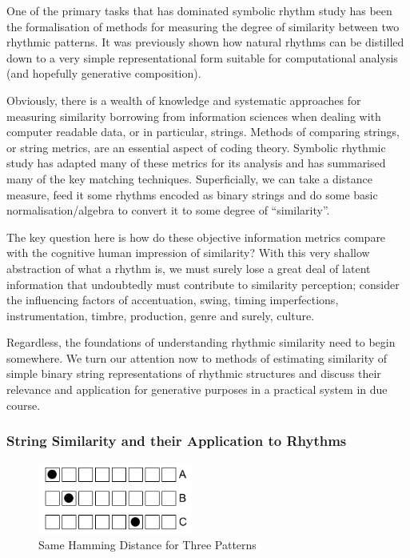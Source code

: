 One of the primary tasks that has dominated symbolic rhythm study has been the formalisation of methods for measuring the degree of similarity between two rhythmic patterns. It was previously shown how natural rhythms can be distilled down to a very simple representational form suitable for computational analysis (and hopefully generative composition).

Obviously, there is a wealth of knowledge and systematic approaches for measuring similarity borrowing from information sciences when dealing with computer readable data, or in particular, strings. Methods of comparing strings, or string metrics, are an essential aspect of coding theory. Symbolic rhythmic study has adapted many of these metrics for its analysis and \cite{Toussaint2004} has summarised many of the key matching techniques. Superficially, we can take a distance measure, feed it some rhythms encoded as binary strings and do some basic normalisation/algebra to convert it to some degree of “similarity”.

The key question here is how do these objective information metrics compare with the cognitive human impression of similarity? With this very shallow abstraction of what a rhythm is, we must surely lose a great deal of latent information that undoubtedly must contribute to similarity perception; consider the influencing factors of accentuation, swing, timing imperfections, instrumentation, timbre, production, genre and surely, culture. 

Regardless, the foundations of understanding rhythmic similarity need to begin somewhere. We turn our attention now to methods of estimating similarity of simple binary string representations of rhythmic structures and discuss their relevance and application for generative purposes in a practical system in due course.

\subsubsection{String Similarity and their Application to Rhythms}

\label{sec:distance_measures}

\begin{figure}
	\begin{center}
		\includegraphics[width=0.45\textwidth]{ch03_symbolic/figures/hamming_comparison.png}
	\end{center}
	\caption[Hamming Distance Comparison]{Same Hamming Distance for Three Patterns}
	\label{fig:hamming_comparison}
\end{figure}

